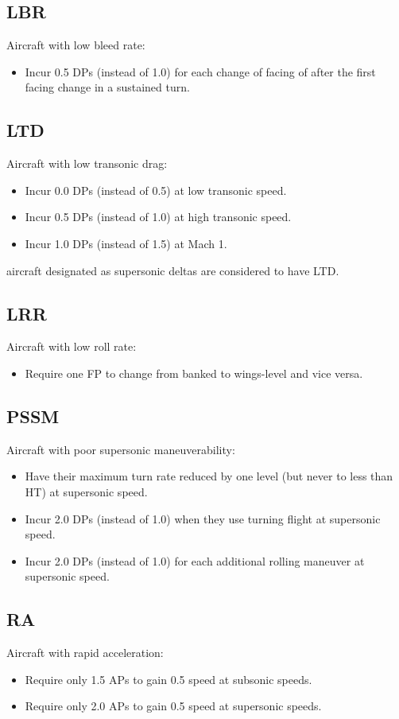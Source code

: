 \documentclass[10pt]{article}
\begin{document}
\subsection{LBR} Aircraft with low bleed rate:
\begin{itemize}
    \item Incur 0.5 DPs (instead of 1.0) for each change of facing of  after the first facing change in a sustained turn.
\end{itemize}

\subsection{LTD} Aircraft with low transonic drag:
\begin{itemize}
    \item Incur 0.0 DPs (instead of 0.5) at low transonic speed.
    \item Incur 0.5 DPs (instead of 1.0) at high transonic speed.
    \item Incur 1.0 DPs (instead of 1.5) at Mach 1.
\end{itemize}
{\AirSup} aircraft designated as supersonic deltas are considered to have LTD.

\subsection{LRR} Aircraft with low roll rate:
\begin{itemize}
    \item Require one FP to change from banked to wings-level and vice versa.
\end{itemize}

\subsection{PSSM} Aircraft with poor supersonic maneuverability:
\begin{itemize}
    \item Have their maximum turn rate reduced by one level (but never to less than HT) at supersonic speed.
    \item Incur 2.0 DPs (instead of 1.0) when they use turning flight at supersonic speed.
    \item Incur 2.0 DPs (instead of 1.0) for each additional rolling maneuver at supersonic speed.
\end{itemize}

\subsection{RA} Aircraft with rapid acceleration:
\begin{itemize}
    \item Require only 1.5 APs to gain 0.5 speed at subsonic speeds.
    \item Require only 2.0 APs to gain 0.5 speed at supersonic speeds.
\end{itemize}
\end{document}
